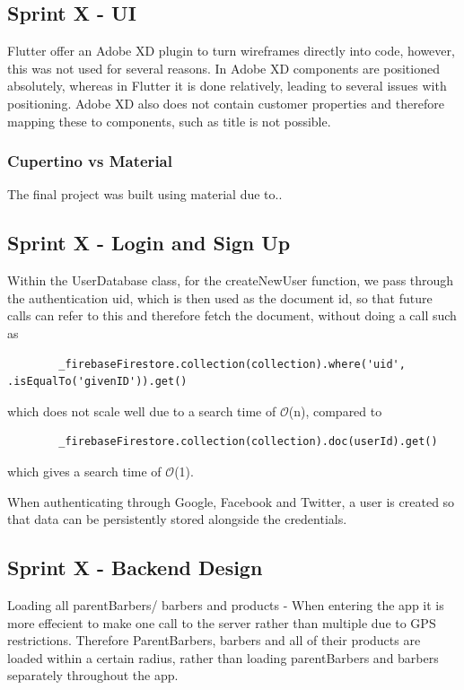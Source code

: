 \documentclass[12pt]{article}
\begin{document}
	
	
	\subsection{Sprint X - UI}
	Flutter offer an Adobe XD plugin to turn wireframes directly into code, however, this was not used for several reasons. In Adobe XD components are positioned absolutely, whereas in Flutter it is done relatively, leading to several issues with positioning. Adobe XD also does not contain customer properties and therefore mapping these to components, such as title is not possible.
	
	\subsubsection{Cupertino vs Material}
	The final project was built using material due to..
	
	\subsection{Sprint X - Login and Sign Up}
	Within the UserDatabase class, for the createNewUser function, we pass through the authentication uid, which is then used as the document id, so that future calls can refer to this and therefore fetch the document, without doing a call such as 
	\begin{lstlisting}
		_firebaseFirestore.collection(collection).where('uid', .isEqualTo('givenID')).get()
	\end{lstlisting}
	which does not scale well due to a search time of $\mathcal{O}$(n), compared to 
	\begin{lstlisting}
		_firebaseFirestore.collection(collection).doc(userId).get()
	\end{lstlisting}
	which gives a search time of $\mathcal{O}$(1).
	
	When authenticating through Google, Facebook and Twitter, a user is created so that data can be persistently stored alongside the credentials.
	
	
	\subsection{Sprint X - Backend Design}
	
	Loading all parentBarbers/ barbers and products - 
	When entering the app it is more effecient to make one call to the server rather than multiple due to GPS restrictions. Therefore ParentBarbers, barbers and all of their products are loaded within a certain radius, rather than loading parentBarbers and barbers separately throughout the app. 
	
\end{document}
